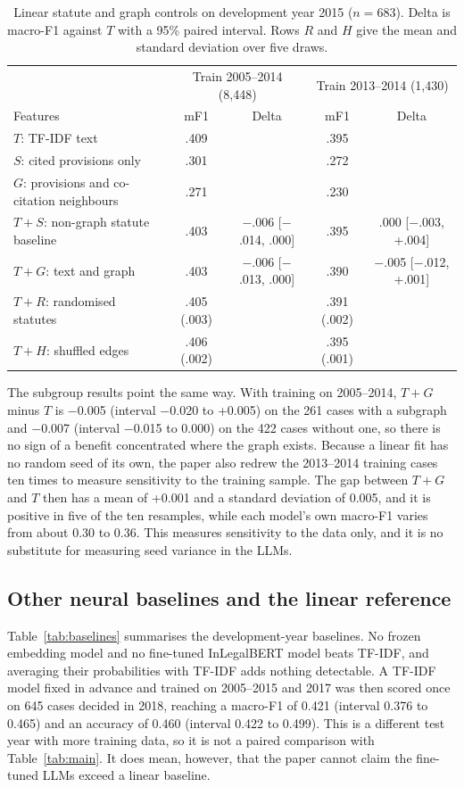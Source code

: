 \documentclass[journal]{IEEEtran}
\begin{document}
\begin{table}[!t]\centering\footnotesize
\setlength{\tabcolsep}{4pt}
\caption{Linear statute and graph controls on development year 2015 ($n=683$). Delta is macro-F1 against $T$ with a 95\% paired interval. Rows $R$ and $H$ give the mean and standard deviation over five draws.}\label{tab:controls}
\begin{tabular}{@{}lcccc@{}}\toprule
& \multicolumn{2}{c}{Train 2005--2014 (8,448)} & \multicolumn{2}{c}{Train 2013--2014 (1,430)}\\
Features & mF1 & Delta & mF1 & Delta\\\midrule
$T$: TF-IDF text & .409 & & .395 & \\
$S$: cited provisions only & .301 & & .272 & \\
$G$: provisions and co-citation neighbours & .271 & & .230 & \\
$T{+}S$: non-graph statute baseline & .403 & $-$.006 [$-$.014, .000] & .395 & .000 [$-$.003, +.004]\\
$T{+}G$: text and graph & .403 & $-$.006 [$-$.013, .000] & .390 & $-$.005 [$-$.012, +.001]\\
$T{+}R$: randomised statutes & .405 (.003) & & .391 (.002) & \\
$T{+}H$: shuffled edges & .406 (.002) & & .395 (.001) & \\\bottomrule
\end{tabular}\end{table}

The subgroup results point the same way. With training on 2005--2014, $T{+}G$ minus $T$ is $-$0.005 (interval $-$0.020 to +0.005) on the 261 cases with a subgraph and $-$0.007 (interval $-$0.015 to 0.000) on the 422 cases without one, so there is no sign of a benefit concentrated where the graph exists. Because a linear fit has no random seed of its own, the paper also redrew the 2013--2014 training cases ten times to measure sensitivity to the training sample. The gap between $T{+}G$ and $T$ then has a mean of +0.001 and a standard deviation of 0.005, and it is positive in five of the ten resamples, while each model's own macro-F1 varies from about 0.30 to 0.36. This measures sensitivity to the data only, and it is no substitute for measuring seed variance in the LLMs.

\subsection{Other neural baselines and the linear reference}
Table~\ref{tab:baselines} summarises the development-year baselines. No frozen embedding model and no fine-tuned InLegalBERT model beats TF-IDF, and averaging their probabilities with TF-IDF adds nothing detectable. A TF-IDF model fixed in advance and trained on 2005--2015 and 2017 was then scored once on 645 cases decided in 2018, reaching a macro-F1 of 0.421 (interval 0.376 to 0.465) and an accuracy of 0.460 (interval 0.422 to 0.499). This is a different test year with more training data, so it is not a paired comparison with Table~\ref{tab:main}. It does mean, however, that the paper cannot claim the fine-tuned LLMs exceed a linear baseline.
\end{document}
